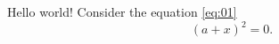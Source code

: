 \documentclass[12pt]{article}
\begin{document}
Hello world!
Consider the equation \eqref{eq:01}
\begin{equation}
  (a + x)^2 = 0.
  \label{eq:01}
\end{equation}
\end{document}
